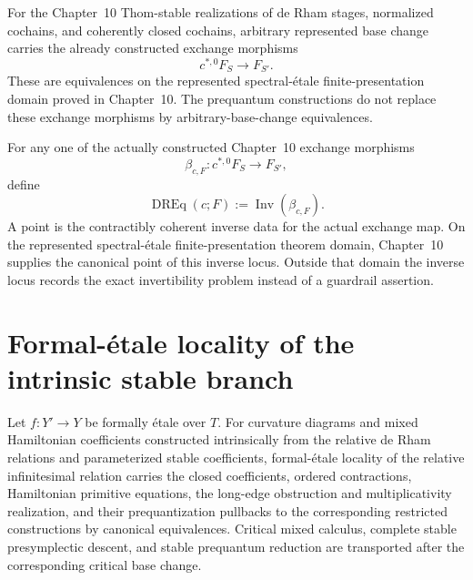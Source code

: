 \begin{proposition}
\label{prop:prequantum-thom-stable-realized-base-change-scope}
For the Chapter~10 Thom-stable realizations of de Rham stages, normalized cochains,
and coherently closed cochains, arbitrary represented base change carries the
already constructed exchange morphisms
\[
c^{*,0}F_S\longrightarrow F_{S'}.
\]
These are equivalences on the represented spectral-\'etale finite-presentation
domain proved in Chapter~10.  The prequantum constructions do not replace these
exchange morphisms by arbitrary-base-change equivalences.
\end{proposition}

\begin{definition}
\label{def:prequantum-realized-dr-exchange-inverse-locus}
For any one of the actually constructed Chapter~10 exchange morphisms
\[
\beta_{c,F}:c^{*,0}F_S\longrightarrow F_{S'},
\]
define
\[
\boxed{
\operatorname{DREq}(c;F)
:=
\operatorname{Inv}(\beta_{c,F}).
}
\]
A point is the contractibly coherent inverse data for the actual exchange map.
On the represented spectral-\'etale finite-presentation theorem domain,
Chapter~10 supplies the canonical point of this inverse locus.  Outside that
domain the inverse locus records the exact invertibility problem instead of a
guardrail assertion.
\end{definition}

\section{Formal-\'etale locality of the intrinsic stable branch}
\label{sec:prequantum-formal-etale-locality}

\begin{theorem}
\label{thm:prequantum-formal-etale-locality}
Let $f:Y'\to Y$ be formally \'etale over $T$.  For curvature diagrams and mixed
Hamiltonian coefficients constructed intrinsically from the relative de Rham
relations and parameterized stable coefficients, formal-\'etale locality of the
relative infinitesimal relation carries the closed coefficients, ordered
contractions, Hamiltonian primitive equations, the long-edge obstruction and
multiplicativity realization, and their prequantization pullbacks to the
corresponding restricted constructions by canonical equivalences.
Critical mixed calculus, complete stable presymplectic descent, and stable
prequantum reduction are transported after the corresponding critical base change.
\end{theorem}

